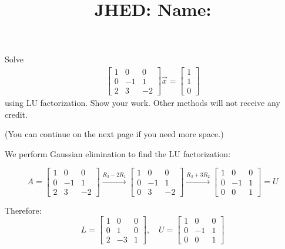\documentclass[reqno, answers]{exam}
\title{\normalsize{
  JHED: \underline{\hspace{4cm}} \hspace{1em} Name: \underline{\hspace{9cm}}}
   }
\author{}
\date{}
\begin{document}
\maketitle
\vspace{-2cm} %

\begin{questions}

\question Solve 
  \begin{align*}
    \begin{bmatrix} 1 & 0 & 0 \\ 0 & -1 & 1 \\ 2 & 3 & -2 \end{bmatrix} \vec{x} = \begin{bmatrix} 1 \\ 1 \\ 0 \end{bmatrix}
  \end{align*}
  using LU factorization. Show your work. Other methods will not receive any credit.

  (You can continue on the next page if you need more space.)
  \begin{solution}
    We perform Gaussian elimination to find the LU factorization:
    
    $$A = \begin{bmatrix} 1 & 0 & 0 \\ 0 & -1 & 1 \\ 2 & 3 & -2 \end{bmatrix} \xrightarrow{R_3 - 2R_1} \begin{bmatrix} 1 & 0 & 0 \\ 0 & -1 & 1 \\ 0 & 3 & -2 \end{bmatrix} \xrightarrow{R_3 + 3R_2} \begin{bmatrix} 1 & 0 & 0 \\ 0 & -1 & 1 \\ 0 & 0 & 1 \end{bmatrix} = U$$

    Therefore:
    $$L = \begin{bmatrix} 1 & 0 & 0 \\ 0 & 1 & 0 \\ 2 & -3 & 1 \end{bmatrix}, \quad U = \begin{bmatrix} 1 & 0 & 0 \\ 0 & -1 & 1 \\ 0 & 0 & 1 \end{bmatrix}$$


\end{solution}
\end{questions}
\end{document}

